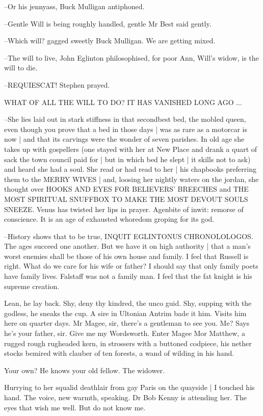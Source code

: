 --Or his jennyass,
Buck Mulligan antiphoned.

--Gentle Will is being roughly handled,
gentle Mr Best said gently.

--Which will?
gagged sweetly Buck Mulligan.
We are getting mixed.

--The will to live,
John Eglinton philosophised,
for poor Ann,
Will's widow,
is the will to die.

--REQUIESCAT!
Stephen prayed.


    WHAT OF ALL THE WILL TO DO?
    IT HAS VANISHED LONG AGO ...


--She lies laid out in stark stiffness in that secondbest bed,
the mobled queen,
even though you prove that a bed in those days |
was as rare as a motorcar is now |
and that its carvings were the wonder of seven parishes.
In old age she takes up with gospellers
(one stayed with her at New Place
and drank a quart of sack the town council paid for |
but in which bed he slept |
it skills not to ask)
and heard she had a soul.
She read or had read to her |
his chapbooks preferring them to the MERRY WIVES |
and, loosing her nightly waters on the jordan,
she thought over HOOKS AND EYES FOR BELIEVERS' BREECHES
and THE MOST SPIRITUAL SNUFFBOX TO MAKE THE MOST DEVOUT SOULS SNEEZE.
Venus has twisted her lips in prayer.
Agenbite of inwit:
remorse of conscience.
It is an age of exhausted whoredom groping for its god.

--History shows that to be true,
INQUIT EGLINTONUS CHRONOLOLOGOS.
The ages succeed one another.
But we have it on high authority |
that a man's worst enemies shall be those of his own house and family.
I feel that Russell is right.
What do we care for his wife or father?
I should say that only family poets have family lives.
Falstaff was not a family man.
I feel that the fat knight is his supreme creation.

Lean, he lay back.
Shy, deny thy kindred,
the unco guid.
Shy, supping with the godless,
he sneaks the cup.
A sire in Ultonian Antrim bade it him.
Visits him here on quarter days.
Mr Magee, sir,
there's a gentleman to see you.
Me?
Says he's your father, sir.
Give me my Wordsworth.
Enter Magee Mor Matthew,
a rugged rough rugheaded kern,
in strossers with a buttoned codpiece,
his nether stocks bemired with clauber of ten forests,
a wand of wilding in his hand.

Your own?
He knows your old fellow.
The widower.

Hurrying to her squalid deathlair from gay Paris on the quayside |
I touched his hand.
The voice, new warmth, speaking.
Dr Bob Kenny is attending her.
The eyes that wish me well.
But do not know me.

